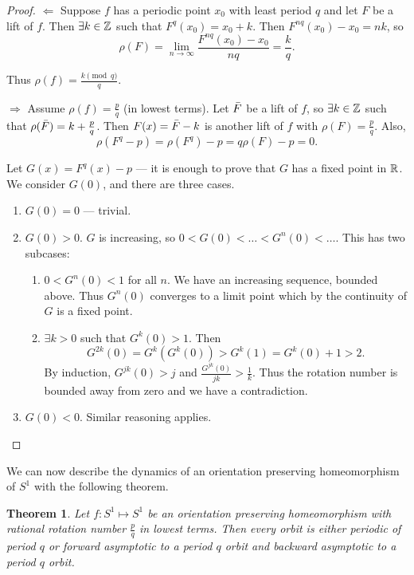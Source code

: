 \documentclass{notes}
\theoremstyle{plain}
\newtheorem{theorem}[proposition]{Theorem}
\begin{document}
\begin{proof}
$\Leftarrow$  Suppose $f$ has a periodic point $x_0$ with least period
$q$ and let $F$ be a lift of $f$.  Then $\exists k \in \mathbb{Z}$ such that
$F^q(x_0) = x_0 + k$.  Then $F^{nq}(x_0) - x_0 = nk$, so
\[
\rho(F) = \lim_{n \to \infty} \frac{F^{nq}(x_0) - x_0}{nq} = \frac{k}{q}.
\]

Thus $\rho(f) = \frac{k \pmod{q}}{q}$.

$\Rightarrow$  Assume $\rho(f) = \tfrac{p}{q}$ (in lowest terms).  Let
$\Bar{F}$ be a lift of $f$, so $\exists k \in \mathbb{Z}$ such that
$\rho(\Bar{F}) = k + \tfrac{p}{q}$.  Then $F(x) = \Bar{F} - k$ is another
lift of $f$ with $\rho(F) = \tfrac{p}{q}$.  Also,
\[
\rho(F^q -p) = \rho(F^q) - p = q \rho(F) - p = 0.
\]

Let $G(x) = F^q(x) - p$ --- it is enough to prove that $G$ has a fixed
point in $\mathbb{R}$.  We consider $G(0)$, and there are three cases.

\begin{enumerate}
\item $G(0)=0$ --- trivial.
\item $G(0) > 0$.  $G$ is increasing, so $0 < G(0) < \dots < G^n(0) < \dots$.
  This has two subcases:
  \begin{enumerate}
  \item $0 < G^n(0) < 1$ for all $n$.  We have an increasing sequence,
    bounded above. Thus $G^n(0)$ converges to a limit point which by the
    continuity of $G$ is a fixed point.
  \item $\exists k > 0$ such that $G^k(0) > 1$.  Then
    \[
    G^{2k}(0) = G^k(G^k(0)) > G^k(1) = G^k(0) + 1 > 2.
    \]
    By induction, $G^{jk}(0) > j$ and $\tfrac{G^{jk}(0)}{jk} > \tfrac{1}{k}$.
    Thus the rotation number is bounded away from zero and we have a
    contradiction.
  \end{enumerate}
\item $G(0) < 0$.  Similar reasoning applies.
\end{enumerate}
\end{proof}

We can now describe the dynamics of an orientation preserving
homeomorphism of $S^1$ with the following theorem.

\begin{theorem} Let $f \colon S^1 \mapsto S^1$ be an orientation
preserving homeomorphism with rational rotation number $\tfrac{p}{q}$
in lowest terms.  Then every orbit is either periodic of period $q$
or forward asymptotic to a period $q$ orbit and backward asymptotic
to a period $q$ orbit.
\end{theorem}
\end{document}
